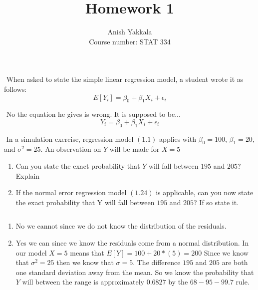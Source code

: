 \documentclass[10pt]{article}
\newenvironment{problem}[2][Problem]{\begin{trivlist}
\item[\hskip \labelsep {\bfseries #1}\hskip \labelsep {\bfseries #2.}]}{\end{trivlist}}
\newenvironment{answer}[2][Answer]{\begin{trivlist}
\item[\hskip \labelsep {\bfseries #1}\hskip \labelsep {\bfseries #2.}]}{\end{trivlist}}
\begin{document}
 
\title{Homework 1}
\author{Anish Yakkala\\
Course number: STAT 334}
\maketitle
 
\begin{problem}{1}
$ $\newline
When asked to state the simple linear regression model, a student wrote it as follows: 
\[
E[Y_{i}] = \beta_{0} + \beta_{1}X_{i} + \epsilon_{i}
\]
\end{problem}

\begin{answer}{1}
$ $\newline
No the equation he gives is wrong. It is supposed to be...
\[
Y_{i} = \beta_{0} + \beta_{1}X_{i} + \epsilon_{i}
\]
\end{answer}

\begin{problem}{2}
$ $\newline
In a simulation exercise, regression model $(1.1)$ applies with $\beta_{0}=100$, $\beta_{1} = 20$, and $\sigma^{2} = 25$.
An observation on $Y$ will be made for $X=5$

\begin{enumerate}
    \item Can you state the exact probability that $Y$ will fall between $195$ and $205$? Explain
    \item If the normal error regression model $(1.24)$ is applicable, can you now state the exact probability that Y will fall between $195$ and $205$? If so state it.
\end{enumerate}

\end{problem}

\begin{answer}{2}
$ $\newline
\begin{enumerate}
    \item No we cannot since we do not know the distribution of the residuals.
    \item Yes we can since we know the residuals come from a normal distribution. In our model $X=5$ means that $E[Y] = 100 + 20*(5) = 200$ Since we know that $\sigma^{2}=25$ then we know that $\sigma = 5$. The difference $195$ and $205$ are both one standard deviation away from the mean. So we know the probability that $Y$ will between the range is approximately $0.6827$ by the $68-95-99.7$ rule.
\end{enumerate}

\end{answer}
\end{document}
